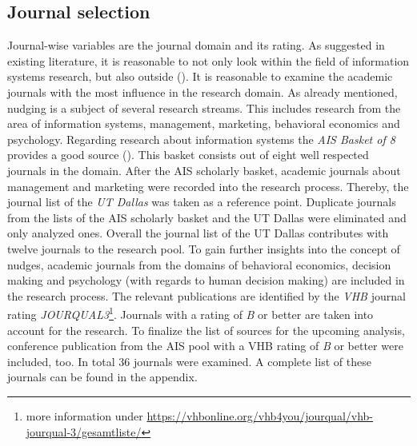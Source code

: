 \subsection{Journal selection}
Journal-wise variables are the journal domain and its rating. As suggested in existing literature, it is reasonable to not only look within the field of information systems research, but also outside (\cite{webster_analyzing_2002}). It is reasonable to examine the academic journals with the most influence in the research domain. As already mentioned, nudging is a subject of several research streams. This includes research from the area of information systems, management, marketing, behavioral economics and psychology. Regarding research about information systems the \textit{AIS Basket of 8} provides a good source (\cite{alavi_review_1992}). This basket consists out of eight well respected journals in the domain. After the AIS scholarly basket, academic journals about management and marketing were recorded into the research process. Thereby, the journal list of the \textit{UT Dallas} was taken as a reference point. Duplicate journals from the lists of the AIS scholarly basket and the UT Dallas were eliminated and only analyzed ones. Overall the journal list of the UT Dallas contributes with twelve journals to the research pool. To gain further insights into the concept of nudges, academic journals from the domains of behavioral economics, decision making and psychology (with regards to human decision making) are included in the research process. The relevant publications are identified by the \textit{VHB} journal rating \textit{JOURQUAL3}\footnote{more information under \url{https://vhbonline.org/vhb4you/jourqual/vhb-jourqual-3/gesamtliste/}}. Journals with a rating of \textit{B} or better are taken into account for the research. To finalize the list of sources for the upcoming analysis, conference publication from the AIS pool with a VHB rating of \textit{B} or better were included, too. In total 36 journals were examined. A complete list of these journals can be found in the appendix.

